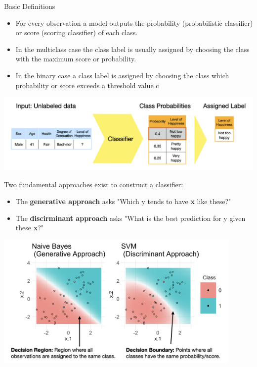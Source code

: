 \documentclass[11pt,compress,t,notes=noshow, xcolor=table]{beamer}
\begin{document}
\begin{vbframe}{Basic Definitions}
\begin{itemize}
\item \small For every observation a model outputs the probability (probabilistic classifier) or score (scoring classifier) of each class.
\item \small In the multiclass case the class label is usually assigned by choosing the class with the maximum score or probability. 
\item \small In the binary case a class label is assigned by choosing the class which probability or score exceeds a threshold value c
\end{itemize}

\vspace{5mm}

\begin{center}
  \includegraphics[width = \textwidth]{slides/supervised-classification/figure_man/nutshell-classification-label-assignment.png}
\end{center}

Two fundamental approaches exist to construct a classifier:
\begin{itemize}
\item \small The \textbf{generative approach} asks "Which y tends to have \textbf{x} like these?" 
\item \small The \textbf{discirminant approach} asks "What is the best prediction for y given these \textbf{x}?"
\end{itemize}

\begin{center}
  \includegraphics[width = 0.9\textwidth]{slides/supervised-classification/figure_man/nutshell_classif_binary_task.png}
\end{center}
\end{vbframe}
\end{document}
